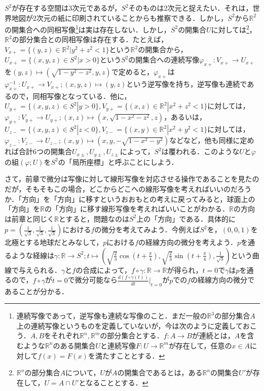 \documentclass{jsarticle}
\def\realnum{{\mathbb R}}
\def\dfrac{\displaystyle\frac}
\begin{document}
$S^2$が存在する空間は3次元であるが，$S^2$そのものは2次元と捉えたい．それは，世界地図が2次元の紙に印刷されていることからも推察できる．しかし，$S^2$から$\realnum^2$の開集合への同相写像\footnote{連続写像であって，逆写像も連続な写像のこと．まだ一般の$\realnum^3$の部分集合$A$上の連続写像というものを定義していないが，今は次のように定義しておこう．$A,B$をそれぞれ$\realnum^n,\realnum^m$の部分集合とする．$f:A\rightarrow B$が連続とは，$A$を含むような$\realnum^n$のある開集合$U$と連続写像$F:U\rightarrow \realnum^m$が存在して，任意の$x\in A$に対して$f(x)=F(x)$を満たすこととする．}は実は存在しない．しかし，$S^2$の開集合$U$に対しては\footnote{$\realnum^n$の部分集合$A$について，$U$が$A$の開集合であるとは，ある$\realnum^n$の開集合$U'$が存在して，$U=A\cap U'$となることとする．}，$\realnum^2$の部分集合との同相写像は存在する．たとえば，$V_{x+}=\{(y,z)\in \realnum^2|y^2+z^2<1\}$という$\realnum^2$の開集合から，$U_{x+}=\{(x,y,z)\in S^2|x>0\}$という$S^2$の開集合への連続写像$\varphi_{x+}:V_{x+}\rightarrow U_{x+}$を$(y,z)\mapsto (\sqrt{1-y^2-z^2},y,z)$で定めると，$\varphi_{x+}$は$\varphi_{x+}^{-1}:U_{x+}\rightarrow V_{x+};(x,y,z)\mapsto (y,z)$という逆写像を持ち，逆写像も連続であるので，同相写像となっている．他に，$U_{y+}=\{(x,y,z)\in S^2|y>0\},V_{y+}=\{(x,z)\in\realnum^2|x^2+z^2<1\}$に対しては，$\varphi_{y+}:V_{y+}\rightarrow U_{y+};(x,z)\mapsto (x,\sqrt{1-x^2-z^2},z)$，あるいは，$U_{z-}=\{(x,y,z)\in S^2|z<0\},V_{z-}=\{(x,y)\in\realnum^2|x^2+y^2<1\}$に対しては，$\varphi_{z-}:V_{z-}\rightarrow U_{z-};(x,y)\mapsto (x,y,-\sqrt{1-x^2-y^2})$などなど，他も同様に定めれば合計$6$つの開集合$U_{x\pm},U_{y\pm},U_{z\pm}$によって，$S^2$は覆われる．このような$U$と$\varphi$の組$(\varphi;U)$を$S^2$の「局所座標」と呼ぶことにしよう．


さて，前章で微分は写像に対して線形写像を対応させる操作であることを見たのだが，そもそもこの場合，どこからどこへの線形写像を考えればいいのだろうか．「方向」を「方向」に移すというおおもとの考えに戻ってみると，球面上の「方向」を$\realnum$の「方向」に移す線形写像を考えればいいことがわかる．$\realnum$の方向は前章と同じく$\realnum$とすると，問題なのは$S^2$上の「方向」である．具体的に$p=(\frac{1}{\sqrt{3}},\frac{1}{\sqrt{3}},\frac{1}{\sqrt{3}})$における$f$の微分を考えてみよう．今例えば$S^2$を，$(0,0,1)$を北極とする地球だとみなして，$p$における$f$の経線方向の微分を考えよう．$p$を通るような経線は$\gamma:\realnum\rightarrow S^2;t\mapsto(\sqrt{\frac{2}{3}}\cos(t+\frac{\pi}{4}),\sqrt{\frac{2}{3}}\sin(t+\frac{\pi}{4}),\frac{1}{\sqrt{3}})$という曲線で与えられる．$\gamma$と$f$の合成によって，$f\circ \gamma:\realnum\rightarrow\realnum$が得られ，$t=0$で$\gamma$は$p$を通るので，$f\circ\gamma$が$t=0$で微分可能なら$\dfrac{d(f\circ\gamma(t))}{dt}\Big|_{t=0}$が$p$での$f$の経線方向の微分であることが分かる．
\end{document}
